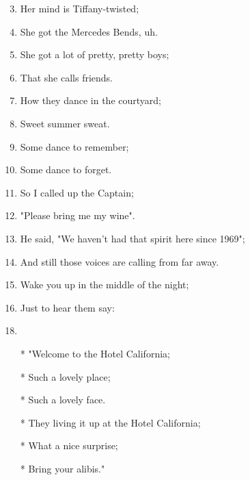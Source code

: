 \documentclass{article}
\begin{document}
\begin{center}
\begin{enumerate}
            \item[]
            \item[] 
            \item Her mind is Tiffany-twisted;
            \item She got the Mercedes Bends, uh.
            \item She got a lot of pretty, pretty boys;
            \item That she calls friends.
            \item How they dance in the courtyard;
            \item Sweet summer sweat.
            \item Some dance to remember;
            \item Some dance to forget.
            \item So I called up the Captain;
            \item "Please bring me my wine".
            \item He said, "We haven't had that spirit here since 1969";
            \item And still those voices are calling from far away.
            \item Wake you up in the middle of the night;
            \item Just to hear them say:
 
            \item []
            \item \chorus
            \item[*] "Welcome to the Hotel California;
            \item[*] Such a lovely place;
            \item[*] Such a lovely face.
            \item[*] They living it up at the Hotel California;
            \item[*] What a nice surprise;
            \item[*] Bring your alibis."
        

\end{enumerate}
\end{center}
\end{document}
